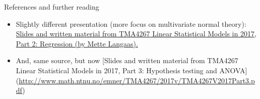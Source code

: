 \documentclass[
  ignorenonframetext,
]{beamer}
\providecommand{\tightlist}{%
  \setlength{\itemsep}{0pt}\setlength{\parskip}{0pt}}
\begin{document}
\begin{frame}{References and further reading}
\label{references-and-further-reading}
\begin{itemize}
\tightlist
\item
  Slightly different presentation (more focus on multivariate normal
  theory):
  \href{https://www.math.ntnu.no/emner/TMA4267/2017v/TMA4267V2017Part2.pdf}{Slides
  and written material from TMA4267 Linear Statistical Models in 2017,
  Part 2: Regression (by Mette Langaas).}
\item
  And, same source, but now {[}Slides and written material from TMA4267
  Linear Statistical Models in 2017, Part 3: Hypothesis testing and
  ANOVA{]}
  (\url{http://www.math.ntnu.no/emner/TMA4267/2017v/TMA4267V2017Part3.pdf})
\end{itemize}
\end{frame}
\end{document}
